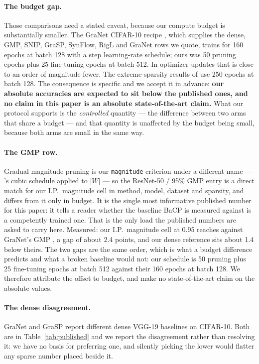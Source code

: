 \paragraph{The budget gap.}
Those comparisons need a stated caveat, because our compute budget is
substantially smaller. The GraNet CIFAR-10 recipe \citep{liu2021granet}, which
supplies the dense, GMP, SNIP, GraSP, SynFlow, RigL and GraNet rows we quote,
trains for 160 epochs at batch 128 with a step learning-rate schedule; ours was
50 pruning epochs plus 25 fine-tuning epochs at batch 512. In optimizer updates
that is close to an order of magnitude fewer. The extreme-sparsity results of
\citet{li2025east} use 250 epochs at batch 128. The consequence is specific and
we accept it in advance: \textbf{our absolute accuracies are expected to sit
below the published ones, and no claim in this paper is an absolute
state-of-the-art claim.} What our protocol supports is the \emph{controlled}
quantity --- the difference between two arms that share a budget --- and that
quantity is unaffected by the budget being small, because both arms are small in
the same way.

\paragraph{The GMP row.}
Gradual magnitude pruning is our \texttt{magnitude} criterion under a different
name --- \citet{zhu2018prune}'s cubic schedule applied to $|W|$ --- so the
ResNet-50 / 95\% GMP entry is a direct match for our I.P.\ magnitude cell in
method, model, dataset and sparsity, and differs from it only in budget. It is
the single most informative published number for this paper: it tells a reader
whether the baseline BaCP is measured against is a competently trained one. That
is the only load the published numbers are asked to carry here.
Measured: our I.P.\ magnitude cell at 0.95 reaches
 against GraNet's GMP
 \citep{liu2021granet}, a gap of about
2.4 points, and our dense reference  sits
about 1.4 below theirs. The two gaps are the same order, which is what a
budget difference predicts and what a broken baseline would not: our schedule
is 50 pruning plus 25 fine-tuning epochs at batch 512 against their 160 epochs
at batch 128. We therefore attribute the offset to budget, and make no
state-of-the-art claim on the absolute values.

\paragraph{The dense disagreement.}
GraNet \citep{liu2021granet} and GraSP \citep{wang2020grasp} report different
dense VGG-19 baselines on CIFAR-10. Both are in Table~\ref{tab:published} and we
report the disagreement rather than resolving it: we have no basis for
preferring one, and silently picking the lower would flatter any sparse number
placed beside it.

